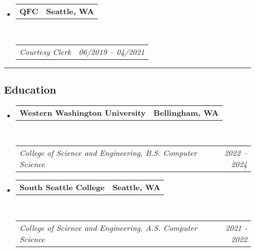 \documentclass[12pt,letterpaper]{article}
\makeatletter
\newcommand{\headerrow}[2]
{\begin{tabular*}{\linewidth}{l@{\extracolsep{\fill}}r}
	#1 &
	#2 \\
\end{tabular*}}
\makeatother
\begin{document}
\begin{itemize}
    \item
          \headerrow
          {\textbf{QFC}}
          {\textbf{Seattle, WA}}
          \\
          \headerrow
          {\emph{Courtesy Clerk}}
          {\emph{06/2019 -- 04/2021}}
\end{itemize}


\hrule
\subsection*{Education}

\begin{itemize}
    \parskip=0.1em

    \item
          \headerrow
          {\textbf{Western Washington University}}
          {\textbf{Bellingham, WA}}
          \\
          \headerrow
          {\emph{College of Science and Engineering, B.S. Computer Science}}
          {\emph{2022 -- 2024}}
    \item
          \headerrow
          {\textbf{South Seattle College}}
          {\textbf{Seattle, WA}}
          \\
          \headerrow
          {\emph{College of Science and Engineering, A.S. Computer Science}}
          {\emph{2021 - 2022}}
\end{itemize}
\end{document}
